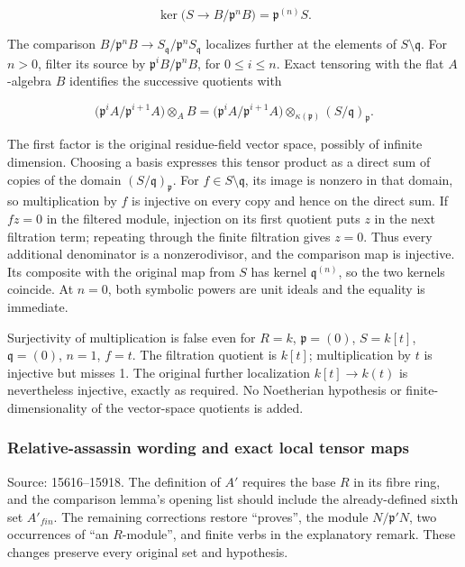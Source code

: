 \[
\ker\bigl(S\to B/\mathfrak p^nB\bigr)=\mathfrak p^{(n)}S.
\]

The comparison \(B/\mathfrak p^nB\to S_{\mathfrak q}/\mathfrak p^nS_{\mathfrak q}\) localizes further at the elements of \(S\setminus\mathfrak q\). For \(n>0\), filter its source by \(\mathfrak p^iB/\mathfrak p^nB\), for \(0\leq i\leq n\). Exact tensoring with the flat \(A\)-algebra \(B\) identifies the successive quotients with

\[
\bigl(\mathfrak p^iA/\mathfrak p^{i+1}A\bigr)\otimes_A B
=\bigl(\mathfrak p^iA/\mathfrak p^{i+1}A\bigr)
 \otimes_{\kappa(\mathfrak p)}(S/\mathfrak q)_{\mathfrak p}.
\]

The first factor is the original residue-field vector space, possibly of infinite dimension. Choosing a basis expresses this tensor product as a direct sum of copies of the domain \((S/\mathfrak q)_{\mathfrak p}\). For \(f\in S\setminus\mathfrak q\), its image is nonzero in that domain, so multiplication by \(f\) is injective on every copy and hence on the direct sum. If \(fz=0\) in the filtered module, injection on its first quotient puts \(z\) in the next filtration term; repeating through the finite filtration gives \(z=0\). Thus every additional denominator is a nonzerodivisor, and the comparison map is injective. Its composite with the original map from \(S\) has kernel \(\mathfrak q^{(n)}\), so the two kernels coincide. At \(n=0\), both symbolic powers are unit ideals and the equality is immediate.

Surjectivity of multiplication is false even for \(R=k\), \(\mathfrak p=(0)\), \(S=k[t]\), \(\mathfrak q=(0)\), \(n=1\), \(f=t\). The filtration quotient is \(k[t]\); multiplication by \(t\) is injective but misses 1. The original further localization \(k[t]\to k(t)\) is nevertheless injective, exactly as required. No Noetherian hypothesis or finite-dimensionality of the vector-space quotients is added.

\subsubsection{Relative-assassin wording and exact local tensor maps}\label{algebra-proof-005-relative-assassin-wording-and-exact-local-tensor-maps}

Source: 15616--15918. The definition of \(A'\) requires the base \(R\) in its fibre ring, and the comparison lemma's opening list should include the already-defined sixth set \(A'_{fin}\). The remaining corrections restore ``proves'', the module \(N/\mathfrak p'N\), two occurrences of ``an \(R\)-module'', and finite verbs in the explanatory remark. These changes preserve every original set and hypothesis.

